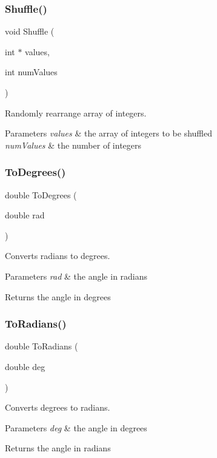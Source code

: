 \subsubsection{\texorpdfstring{Shuffle()}{Shuffle()}}
{\footnotesize\ttfamily void Shuffle (\begin{DoxyParamCaption}\item[{int $\ast$}]{values,  }\item[{int}]{num\+Values }\end{DoxyParamCaption})}

Randomly rearrange array of integers.


\begin{DoxyParams}{Parameters}
{\em values} & the array of integers to be shuffled \\
\hline
{\em num\+Values} & the number of integers \\
\hline
\end{DoxyParams}
\mbox{\label{group__math__group_gab6efcc6e24e777db0fe5e0d0955c2b2d}} 
\subsubsection{\texorpdfstring{To\+Degrees()}{ToDegrees()}}
{\footnotesize\ttfamily double To\+Degrees (\begin{DoxyParamCaption}\item[{double}]{rad }\end{DoxyParamCaption})}

Converts radians to degrees.


\begin{DoxyParams}{Parameters}
{\em rad} & the angle in radians \\
\hline
\end{DoxyParams}
\begin{DoxyReturn}{Returns}
the angle in degrees 
\end{DoxyReturn}
\mbox{\label{group__math__group_gafdd4eddaf6eadf34406a865e0cf6a30a}} 
\subsubsection{\texorpdfstring{To\+Radians()}{ToRadians()}}
{\footnotesize\ttfamily double To\+Radians (\begin{DoxyParamCaption}\item[{double}]{deg }\end{DoxyParamCaption})}

Converts degrees to radians.


\begin{DoxyParams}{Parameters}
{\em deg} & the angle in degrees \\
\hline
\end{DoxyParams}
\begin{DoxyReturn}{Returns}
the angle in radians 
\end{DoxyReturn}
